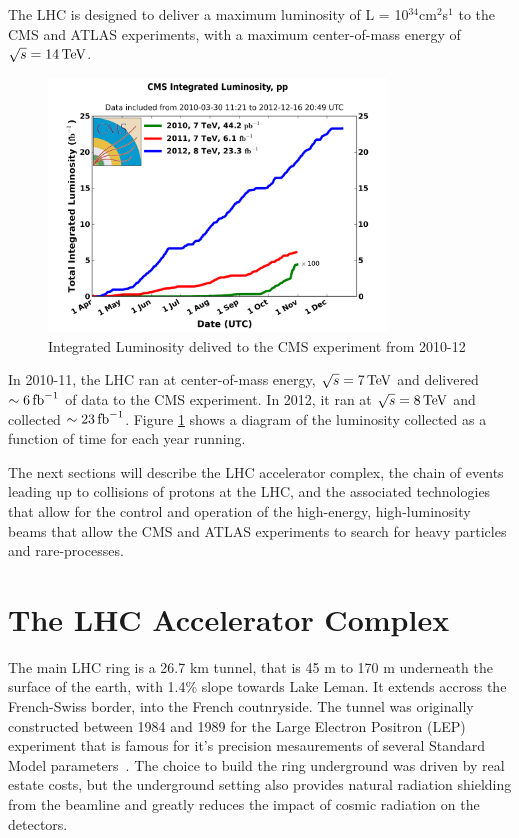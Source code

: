 \noindent The LHC is designed to deliver a maximum luminosity of L =
10$^{34}$cm$^{2}$s$^{1}$ to the CMS and ATLAS experiments, with a
maximum center-of-mass energy of $\sqrt{s}=14\,\text{Te\hspace{-.08em}V}$.  


\begin{figure}[h]
   \centering
  \includegraphics[width=0.8\textwidth]{Figures/Experimental_Results/CMS__int_lumi_cumulative_pp_2.png}
  \caption{Integrated Luminosity delived to the CMS experiment from 2010-12} \label{fig:cms_integrated_lumi}
\end{figure}

\par In 2010-11, the LHC ran at center-of-mass energy,
$\sqrt{s}=7\,\text{Te\hspace{-.08em}V}$ and delivered $\sim6\mbox{\ensuremath{\,\text{fb}^\text{$-$1}}}$ of data to the CMS
experiment.  In 2012, it ran at $\sqrt{s}=8\,\text{Te\hspace{-.08em}V}$ and collected
$\sim23\mbox{\ensuremath{\,\text{fb}^\text{$-$1}}}$.  Figure \ref{fig:cms_integrated_lumi} shows a diagram of
the luminosity collected as a function of time for each year running.  

\par The next sections will describe the LHC accelerator complex, the
chain of events leading up to collisions of protons at the LHC, and
the associated technologies that allow for the control and operation
of the high-energy, high-luminosity beams that allow the CMS and ATLAS
experiments to search for heavy particles and rare-processes.  


\section{The LHC Accelerator Complex}
\label{lhc_injection_chain}

\par The main LHC ring is a 26.7 km tunnel, that is 45 m to 170 m
underneath the surface of the earth, with 1.4$\%$ slope towards Lake
Leman.  It extends accross the French-Swiss border, into the French
coutnryside.  The tunnel was originally constructed between 1984 and 1989 for
the Large Electron Positron (LEP) experiment that is famous for it's
precision mesaurements of several Standard Model
parameters~\cite{lhc:machine_description}.  The choice to build the
ring underground was driven by real estate costs, but the underground
setting also provides natural radiation shielding from the beamline
and greatly reduces the impact of cosmic radiation on the detectors.  

